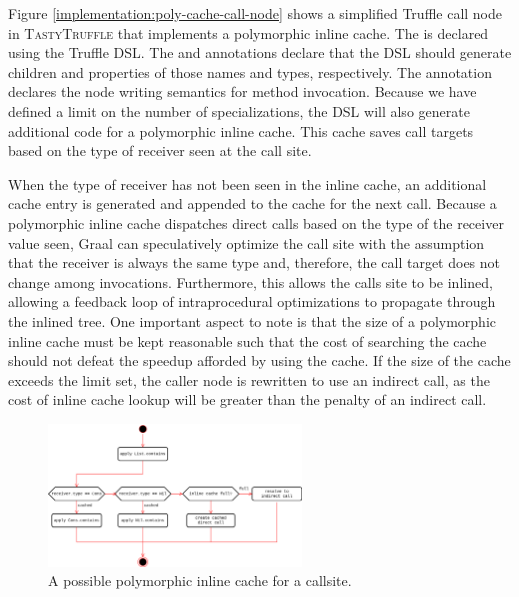 Figure \ref{implementation:poly-cache-call-node} shows a simplified Truffle call node in \textsc{TastyTruffle} that implements a polymorphic inline cache.
The  is declared using the Truffle DSL.
The  and  annotations declare that the DSL should generate children and properties of those names and types, respectively. 
The  annotation declares the node writing semantics for method invocation.
Because we have defined a limit on the number of specializations, the DSL will also generate additional code for a polymorphic inline cache.
This cache saves call targets based on the type of receiver seen at the call site. 

When the type of receiver has not been seen in the inline cache, an additional cache entry is generated and appended to the cache for the next call.
Because a polymorphic inline cache dispatches direct calls based on the type of the receiver value seen, Graal can speculatively optimize the call site with the assumption that the receiver is always the same type and, therefore, the call target does not change among invocations.
Furthermore, this allows the calls site to be inlined, allowing a feedback loop of intraprocedural optimizations\cite{conditional-constant-prop,variable-congruence} to propagate through the inlined tree.
One important aspect to note is that the size of a polymorphic inline cache must be kept reasonable such that the cost of searching the cache should not defeat the speedup afforded by using the cache.
If the size of the cache exceeds the limit set, the caller node is rewritten to use an indirect call, as the cost of inline cache lookup will be greater than the penalty of an indirect call. 

\begin{figure}[!htb]
	\centering
	\includegraphics[width=0.6\textwidth]{figures/tastytruffle-pic-example.png}
	\caption{A possible polymorphic inline cache for a  callsite.}
	\label{example:poly-cache-call-node}
\end{figure}

